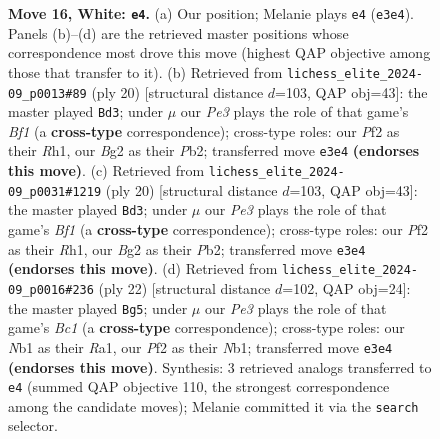 \documentclass[11pt]{article}
\begin{document}
\begin{figure}[p]
\caption{\textbf{Move 16, White: \texttt{e4}.} (a) Our position; Melanie plays \texttt{e4} (\texttt{e3e4}). Panels (b)--(d) are the retrieved master positions whose correspondence most drove this move (highest QAP objective among those that transfer to it). (b) Retrieved from \texttt{lichess\_elite\_2024-09\_p0013\#89} (ply 20) [structural distance $d$=103, QAP obj=43]: the master played \texttt{Bd3}; under $\mu$ our \emph{Pe3} plays the role of that game's \emph{Bf1} (a \textbf{cross-type} correspondence); cross-type roles: our \emph{P}f2 as their \emph{R}h1, our \emph{B}g2 as their \emph{P}b2; transferred move \texttt{e3e4} \textbf{(endorses this move)}. (c) Retrieved from \texttt{lichess\_elite\_2024-09\_p0031\#1219} (ply 20) [structural distance $d$=103, QAP obj=43]: the master played \texttt{Bd3}; under $\mu$ our \emph{Pe3} plays the role of that game's \emph{Bf1} (a \textbf{cross-type} correspondence); cross-type roles: our \emph{P}f2 as their \emph{R}h1, our \emph{B}g2 as their \emph{P}b2; transferred move \texttt{e3e4} \textbf{(endorses this move)}. (d) Retrieved from \texttt{lichess\_elite\_2024-09\_p0016\#236} (ply 22) [structural distance $d$=102, QAP obj=24]: the master played \texttt{Bg5}; under $\mu$ our \emph{Pe3} plays the role of that game's \emph{Bc1} (a \textbf{cross-type} correspondence); cross-type roles: our \emph{N}b1 as their \emph{R}a1, our \emph{P}f2 as their \emph{N}b1; transferred move \texttt{e3e4} \textbf{(endorses this move)}. Synthesis: 3 retrieved analogs transferred to \texttt{e4} (summed QAP objective 110, the strongest correspondence among the candidate moves); Melanie committed it via the \texttt{search} selector.}
\label{fig:thought-m30}
\end{figure}

\clearpage
\end{document}
